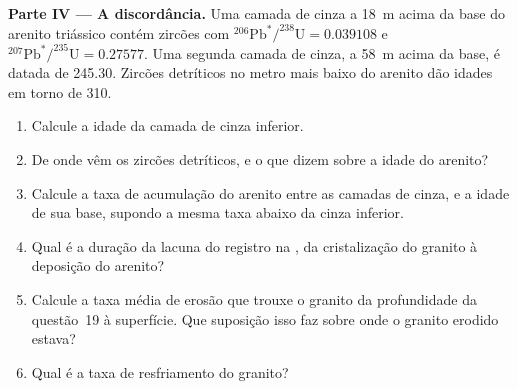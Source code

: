 \begin{problem}
\noindent\textbf{Parte IV --- A discordância.} Uma camada de cinza a \qty{18}{m} acima da base do
arenito triássico contém zircões com $^{206}\mathrm{Pb}^*/^{238}\mathrm{U} = 0.039108$ e
$^{207}\mathrm{Pb}^*/^{235}\mathrm{U} = 0.27577$. Uma segunda camada de cinza, a \qty{58}{m}
acima da base, é datada de \qty{245.30}{\Ma}. Zircões detríticos no metro mais baixo do arenito
dão idades em torno de \qty{310}{\Ma}.
\begin{enumerate}[resume]
  \item Calcule a idade da camada de cinza inferior.
  \item De onde vêm os zircões detríticos, e o que dizem sobre a idade do arenito?
  \item Calcule a taxa de acumulação do arenito entre as camadas de cinza, e a idade de sua base,
        supondo a mesma taxa abaixo da cinza inferior.
  \item Qual é a duração da lacuna do registro na , da cristalização do granito à
        deposição do arenito?
  \item Calcule a taxa média de erosão que trouxe o granito da profundidade da questão~19 à
        superfície. Que suposição isso faz sobre onde o granito erodido estava?
  \item Qual é a taxa de resfriamento do granito?
\end{enumerate}
\end{problem}
